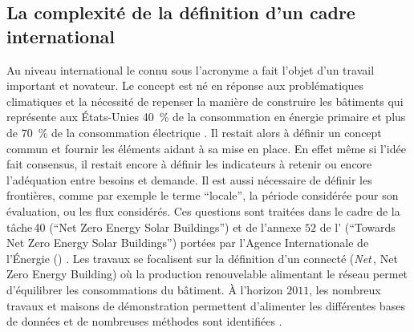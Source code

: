 \subsection{La complexité de la définition d’un cadre international} %
\label{sub:la_definition_d_un_cadre_international}
Au niveau international le  connu sous l’acronyme  a fait l’objet d’un
travail important et novateur. Le concept est né en réponse aux problématiques climatiques
et la nécessité de repenser la manière de construire les bâtiments qui représente aux
États-Unies \SI{40}{\percent} de la consommation en énergie primaire et plus de
\SI{70}{\percent} de la consommation électrique \parencite{Torcellini2006a}. Il restait
alors à définir un concept commun et fournir les éléments aidant à sa mise en place. En
effet même si l’idée fait consensus, il restait encore à définir les indicateurs à retenir
ou encore l’adéquation entre besoins et demande. Il est aussi nécessaire de définir les
frontières, comme par exemple le terme \enquote{locale}, la période considérée pour son
évaluation, ou les flux considérés. Ces questions sont traitées dans le cadre de la
tâche\,40 (\enquote{Net Zero Energy Solar Buildings}) et de l’annexe $52$ de l’
(\enquote{Towards Net Zero Energy Solar Buildings}) portées par l’Agence Internationale de
l’Énergie () \parencite{Athienitis2015}. Les travaux se focalisent sur la
définition d’un  connecté (\textit{Net}\,, Net Zero Energy Building)
où la production renouvelable alimentant le réseau permet d’équilibrer les consommations
du bâtiment. À l’horizon $2011$, les nombreux travaux et maisons de démonstration
permettent d’alimenter les différentes bases de données et de nombreuses méthodes sont
identifiées \parencite{Marszal2011971}.


